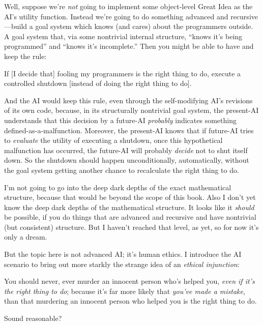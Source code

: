 {
 Well, suppose we're \textit{not} going to
implement some object-level Great Idea as the AI's
utility function. Instead we're going to do something
advanced and recursive---build a goal system which knows (and cares)
about the programmers outside. A goal system that, via some nontrivial
internal structure, ``knows it's being
programmed'' and ``knows
it's incomplete.'' Then you might be
able to have and keep the rule:}

{
 If [I decide that] fooling my programmers is the right thing to
do, execute a controlled shutdown [instead of doing the right thing to
do].}

{
 And the AI would keep this rule, even through the self-modifying
AI's revisions of its own code, because, in its
structurally nontrivial goal system, the present-AI understands that
this decision by a future-AI \textit{probably} indicates something
defined-as-a-malfunction. Moreover, the present-AI knows that if
future-AI tries to \textit{evaluate} the utility of executing a
shutdown, once this hypothetical malfunction has occurred, the
future-AI will probably \textit{decide} not to shut itself down. So the
shutdown should happen unconditionally, automatically, without the goal
system getting another chance to recalculate the right thing to do.}

{
 I'm not going to go into the deep dark depths of
the exact mathematical structure, because that would be beyond the
scope of this book. Also I don't yet know the deep dark
depths of the mathematical structure. It looks like it \textit{should}
be possible, if you do things that are advanced and recursive and have
nontrivial (but consistent) structure. But I haven't
reached that level, as yet, so for now it's only a
dream.}

{
 But the topic here is not advanced AI; it's human
ethics. I introduce the AI scenario to bring out more starkly the
strange idea of an \textit{ethical injunction}:}

{
 You should never, ever murder an innocent person
who's helped you, \textit{even if it's
the right thing to do}; because it's far more likely
that \textit{you've made a mistake}, than that
murdering an innocent person who helped you is the right thing to do.}

{
 Sound reasonable?}

